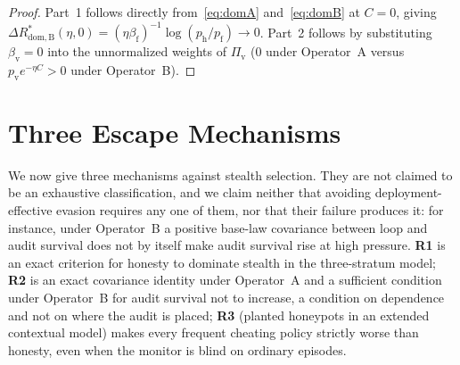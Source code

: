 \documentclass[11pt,a4paper]{article}
\begin{document}
\begin{proof}
Part~1 follows directly from~\eqref{eq:domA} and~\eqref{eq:domB} at $C = 0$, giving $\Delta R_{\mathrm{dom, B}}^*(\eta, 0) = (\eta\beta_{\mathrm{f}})^{-1}\log(p_{\mathrm{h}}/p_{\mathrm{f}}) \to 0$. Part~2 follows by substituting $\beta_{\mathrm{v}} = 0$ into the unnormalized weights of $\Pi_{\mathrm{v}}$ ($0$ under Operator~A versus $p_{\mathrm{v}} e^{-\eta C} > 0$ under Operator~B).
\end{proof}

\section{Three Escape Mechanisms}

We now give three mechanisms against stealth selection. They are not claimed to be an exhaustive classification, and we claim neither that avoiding deployment-effective evasion requires any one of them, nor that their failure produces it: for instance, under Operator~B a positive base-law covariance between loop and audit survival does not by itself make audit survival rise at high pressure. \textbf{R1} is an exact criterion for honesty to dominate stealth in the three-stratum model; \textbf{R2} is an exact covariance identity under Operator~A and a sufficient condition under Operator~B for audit survival not to increase, a condition on dependence and not on where the audit is placed; \textbf{R3} (planted honeypots in an extended contextual model) makes every frequent cheating policy strictly worse than honesty, even when the monitor is blind on ordinary episodes.
\end{document}
